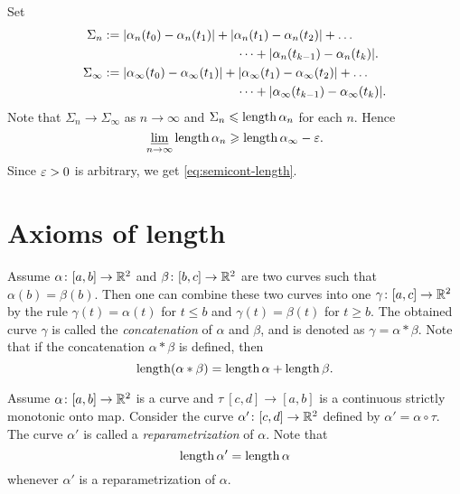 Set 
\begin{align*}\Sigma_n
&\df
|\alpha_n(t_0)-\alpha_n(t_1)|+|\alpha_n(t_1)-\alpha_n(t_2)|+\dots
\\
&\ \ \ \ \ \ \ \ \ \ \ \ \ \ \ \ \ \ \ \ \ \ \ \ \ \ \ \ \ \ \ \ \dots+|\alpha_n(t_{k-1})-\alpha_n(t_k)|.
\\
\Sigma_\infty
&\df
|\alpha_\infty(t_0)-\alpha_\infty(t_1)|+|\alpha_\infty(t_1)-\alpha_\infty(t_2)|+\dots
\\
&\ \ \ \ \ \ \ \ \ \ \ \ \ \ \ \ \ \ \ \ \ \ \ \ \ \ \ \ \ \ \ \ \dots+|\alpha_\infty(t_{k-1})-\alpha_\infty(t_k)|.
\end{align*}
Note that $\Sigma_n\to \Sigma_\infty$ as $n\to\infty$
and $\Sigma_n\leqslant\mathop{\rm length}\nolimits\alpha_n$ for each $n$.
Hence
$$\varliminf_{n\to\infty} \mathop{\rm length}\nolimits\alpha_n \geqslant \mathop{\rm length}\nolimits\alpha_\infty-\varepsilon.$$
Since $\varepsilon>0$ is arbitrary, we get \ref{eq:semicont-length}.\qeds%

\section{Axioms of length}

Assume $\alpha\colon[a,b]\to \mathbb{R}^2$ and $\beta\:[b,c]\z\to \RR^2$ are two curves such that $\alpha(b)=\beta(b)$.
Then one can combine these two curves into one $\gamma\:[a,c]\z\to \RR^2$ by the rule $\gamma(t)=\alpha(t)$ for $t\le b$ and $\gamma(t)=\beta(t)$ for $t\ge b$.
The obtained curve $\gamma$ is called the 
\emph{concatenation} of $\alpha$ and $\beta$, and is denoted as $\gamma=\alpha*\beta$.
Note that if the concatenation $\alpha*\beta$ is defined, then
\[\mathop{\rm length}\nolimits(\alpha*\beta)=\mathop{\rm length}\nolimits\alpha+\mathop{\rm length}\nolimits\beta.\]

Assume $\alpha\colon[a,b]\to \mathbb{R}^2$ is a curve and $\tau\:[c,d]\to [a,b]$ is a continuous strictly monotonic onto map.
Consider the curve $\alpha'\colon[c,d]\to \mathbb{R}^2$ defined by $\alpha'=\alpha\circ\tau$.
The curve $\alpha'$ is called a \emph{reparametrization} of $\alpha$.
Note that 
\[\mathop{\rm length}\nolimits\alpha'=\mathop{\rm length}\nolimits\alpha\]
whenever $\alpha'$ is a reparametrization of $\alpha$.




